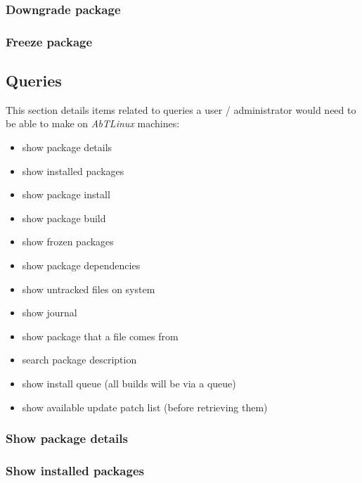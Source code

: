 \newpage
\subsubsection{Downgrade package}


\newpage
\subsubsection{Freeze package}



\newpage
\subsection{Queries}
This section details items related to queries a user / administrator would need to be
able to make on \emph{AbTLinux} machines:

\begin{itemize}
  \item show package details
  \item show installed packages
  \item show package install
  \item show package build
  \item show frozen packages
  \item show package dependencies
  \item show untracked files on system
  \item show journal
  \item show package that a file comes from
  \item search package description
  \item show install queue (all builds will be via a queue)
  \item show available update patch list (before retrieving them)
\end{itemize}

% 
%
\subsubsection{Show package details}


\newpage
\subsubsection{Show installed packages}


